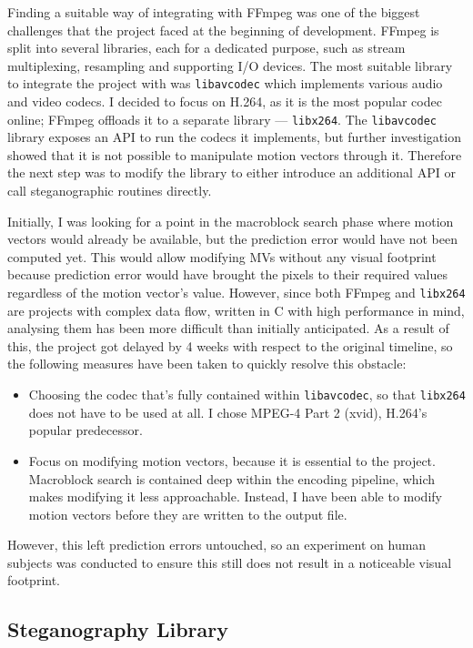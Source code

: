 \documentclass[12pt,british,twoside,notitlepage,usenames,dvipsnames,hypens,final]{report}
\numberwithin{equation}{section}
\numberwithin{figure}{section}
\begin{document}
Finding a suitable way of integrating with FFmpeg was one of the biggest challenges that the project faced at the beginning of development. FFmpeg is split into several libraries, each for a dedicated purpose, such as stream multiplexing, resampling and supporting I/O devices. The most suitable library to integrate the project with was \texttt{libavcodec} which implements various audio and video codecs. I decided to focus on H.264, as it is the most popular codec online; FFmpeg offloads it to a separate library --- \texttt{libx264}. The \texttt{libavcodec} library exposes an API to run the codecs it implements, but further investigation showed that it is not possible to manipulate motion vectors through it. Therefore the next step was to modify the library to either introduce an additional API or call steganographic routines directly.

Initially, I was looking for a point in the macroblock search phase where motion vectors would already be available, but the prediction error would have not been computed yet. This would allow modifying MVs without any visual footprint because prediction error would have brought the pixels to their required values regardless of the motion vector's value. However, since both FFmpeg and \texttt{libx264} are projects with complex data flow, written in C with high performance in mind, analysing them has been more difficult than initially anticipated. As a result of this, the project got delayed by 4 weeks with respect to the original timeline, so the following measures have been taken to quickly resolve this obstacle:
\begin{itemize}
\item Choosing the codec that's fully contained within \texttt{libavcodec}, so that \texttt{libx264} does not have to be used at all. I chose MPEG-4 Part 2 (xvid), H.264's popular predecessor.
\item Focus on modifying motion vectors, because it is essential to the project. Macroblock search is contained deep within the encoding pipeline, which makes modifying it less approachable. Instead, I have been able to modify motion vectors before they are written to the output file.
\end{itemize}

However, this left prediction errors untouched, so an experiment on human subjects was conducted to ensure this still does not result in a noticeable visual footprint.  

\subsection{Steganography Library}
\end{document}
